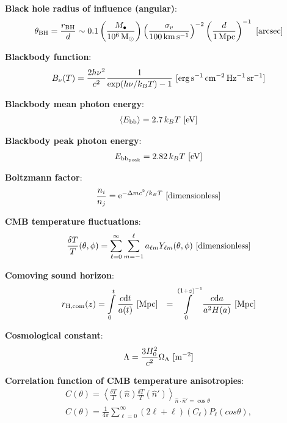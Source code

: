 \documentclass[a4paper,11pt]{article}
\begin{document}
{\noindent}\textbf{Black hole radius of influence (angular)}:
\begin{align*}
    \theta_\mathrm{BH} = \frac{r_\mathrm{BH}}{d} \sim 0.1\left(\frac{M_\bullet}{10^6\,{\rm M_\odot}}\right) \left(\frac{\sigma_v}{100\,{\rm km\,s^{-1}}}\right)^{-2} \left(\frac{d}{1\,{\rm Mpc}}\right)^{-1} ~ [{\rm arcsec}]
\end{align*}

{\noindent}\textbf{Blackbody function}:
\begin{align*}
    B_\nu(T) = \frac{2h\nu^2}{c^2} \frac{1}{\exp(h\nu/k_BT) - 1} ~ [{\rm erg\,s^{-1}\,cm^{-2}\,Hz^{-1}\,sr^{-1}}]
\end{align*}

{\noindent}\textbf{Blackbody mean photon energy}:
\begin{align*}
    \langle E_\mathrm{bb} \rangle = 2.7\,k_BT  ~ [{\rm eV}]
\end{align*}

{\noindent}\textbf{Blackbody peak photon energy}:
\begin{align*}
    E_\mathrm{bb_{peak}} = 2.82\,k_BT ~ [{\rm eV}]
\end{align*}

{\noindent}\textbf{Boltzmann factor}:
\begin{align*}
    \frac{n_i}{n_j} = \mathrm{e}^{-\Delta mc^2/k_BT} ~ [{\rm dimensionless}]
\end{align*}

{\noindent}\textbf{CMB temperature fluctuations}:
\begin{align*}
    \frac{\delta T}{T}(\theta,\phi) = \sum\limits_{\ell=0}^{\infty}\sum\limits_{m=-1}^{\ell} a_{\ell m}Y_{\ell m}(\theta,\phi) ~ [{\rm dimensionless}]
\end{align*}

{\noindent}\textbf{Comoving sound horizon}:
\begin{align*}
    r_\mathrm{H,com}(z) &= \int\limits_0^t \frac{c\mathrm{d}t}{a(t)} ~ [{\rm Mpc}]
    &= \int\limits_0^{(1+z)^{-1}} \frac{c\mathrm{d}a}{a^2H(a)} ~ [{\rm Mpc}]
\end{align*}

{\noindent}\textbf{Cosmological constant}:
\begin{align*}
    \Lambda = \frac{3H_0^2}{c^2}\Omega_\Lambda ~ [{\rm m^{-2}}]
\end{align*}

{\noindent}\textbf{Correlation function of CMB temperature anisotropies}:
\begin{align*}
    C(\theta) = \left\langle\frac{\delta T}{T}(\hat{n})\frac{\delta T}{T}(\hat{n}')\right\rangle_{\hat{n}\cdot\hat{n}'=\cos\theta} \\
    C(\theta) = \frac{1}{4\pi} \sum\limits_{\ell=0}^\infty (2\ell+\ell)(C_\ell)P_\ell(cos\theta),
\end{align*}
\end{document}
